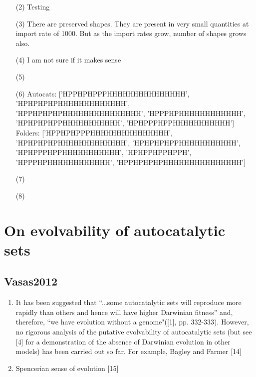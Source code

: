 \documentclass[journal=jacsat,manuscript=article,layout=twocolumn]{achemso}
\begin{document}
\begin{enumerate}
 \item [(2)] Testing
 \item [(3)] There are preserved shapes. They are present in very small quantities at import rate 
of 1000. But as the import rates grow, number of shapes grows also.
 \item [(4)] I am not sure if it makes sense
 \item [(5)]
 \item [(6)]Autocats: ['HPPHPHPPPHHHHHHHHHHHHHHH', 'HPHPHPHPHHHHHHHHHHHHH', 
'HPPHPHPHPHHHHHHHHHHHHHHH', 'HPPPHPHHHHHHHHHHHH', 'HPHPHPHPPHHHHHHHHHHH', 'HPHPPPHPPHHHHHHHHHHH']\\
Folders: ['HPPHPHPPPHHHHHHHHHHHHHHH', 'HPHPHPHPHHHHHHHHHHHHH', 'HPHPHPHPPHHHHHHHHHHH', 
'HPHPPPHPPHHHHHHHHHHH', 'HPHPPHPPHPPH', 'HPPPHPHHHHHHHHHHHH', 'HPPHPHPHPHHHHHHHHHHHHHHH']

 \item [(7)]
 \item [(8)]
\end{enumerate}
 
\section{On evolvability of autocatalytic sets }
\subsection{Vasas2012 \citep{Vasas2012}} 
\begin{enumerate}
\item It has been suggested that “...some autocatalytic
sets will reproduce more rapidly than others and
hence will have higher Darwinian fitness” and, therefore,
“we have evolution without a genome"([1], pp. 332-333).
However, no rigorous analysis of the putative evolvability
of autocatalytic sets (but see [4] for a demonstration
of the absence of Darwinian evolution in other models)
has been carried out so far. For example, Bagley and
Farmer [14]
\item Spencerian sense of evolution [15]
\end{enumerate} 
 
\end{document}
